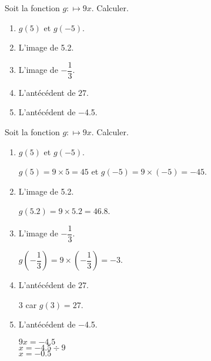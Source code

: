 \begin{exercice}
    Soit la fonction $g:\longmapsto 9x$. Calculer.
    \begin{enumerate}
        \item $g(5)$ et $g(-5)$.
        \item L'image de \num{5.2}.
        \item L'image de $-\dfrac{1}{3}$.
        \item L'antécédent de $27$.
        \item L'antécédent de \num{-4.5}.
    \end{enumerate}
\end{exercice}
\begin{corrige}
    Soit la fonction $g:\longmapsto 9x$. Calculer.

    \begin{enumerate}
        \item $g(5)$ et $g(-5)$.
        
        {\red $g(5)=9\times 5 = 45$ et $g(-5)=9\times (-5)=-45$.}
        \item L'image de \num{5.2}.
        
        {\red $g(\num{5.2})= 9\times \num{5.2} = \num{46.8}$.}
        \item L'image de $-\dfrac{1}{3}$.
        
        {\red $g(-\dfrac{1}{3})= 9\times \left(-\dfrac{1}{3}\right) = -3$.}
        \item L'antécédent de $27$.
        
        {\red $3$ car $g(3)= 27$.}
        \item L'antécédent de \num{-4.5}.
        
        {\red $9x=\num{-4.5}$\\ $x=\num{-4.5}\div 9$\\ $x=\num{-0.5}$}
    \end{enumerate}
\end{corrige}
